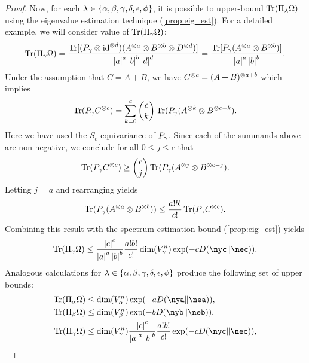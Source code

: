 \documentclass[notitlepage, 10pt]{article}
\begin{document}
\begin{proof}
    Now, for each $\lambda \in \{\alpha, \beta, \gamma, \delta, \epsilon, \phi\}$, it is possible to upper-bound $\operatorname{Tr}(\Pi_{\lambda} \Omega)$ using the eigenvalue estimation technique (\cref{prop:eig_est}).
    For a detailed example, we will consider value of $\operatorname{Tr}(\Pi_{\gamma} \Omega)$:
    \begin{align}
        \operatorname{Tr}(\Pi_{\gamma} \Omega)
        = \frac{\operatorname{Tr}[(P_{\gamma} \otimes \operatorname{id}^{\otimes d})(A^{\otimes a}\otimes B^{\otimes b} \otimes D^{\otimes d})]}{\left|a\right|^{a}\left|b\right|^{b}\left|d\right|^{d}}
        = \frac{\operatorname{Tr}[P_{\gamma}(A^{\otimes a}\otimes B^{\otimes b})]}{\left|a\right|^{a}\left|b\right|^{b}}.
    \end{align}
    Under the assumption that $C = A+B$, we have $C^{\otimes c} = (A+B)^{\otimes a+b}$ which implies
    \begin{equation}
        \operatorname{Tr}(P_{\gamma} C^{\otimes c}) = \sum_{k=0}^{c} \binom{c}{k} \operatorname{Tr}(P_{\gamma} (A^{\otimes k} \otimes B^{\otimes c-k}).
    \end{equation}
    Here we have used the $S_{c}$-equivariance of $P_{\gamma}$.
    Since each of the summands above are non-negative, we conclude for all $0 \leq j \leq c$ that
    \begin{equation}
        \operatorname{Tr}(P_{\gamma} C^{\otimes c}) \geq \binom{c}{j} \operatorname{Tr}(P_{\gamma} (A^{\otimes j} \otimes B^{\otimes c-j}).
    \end{equation}
    Letting $j = a$ and rearranging yields
    \begin{equation}
        \operatorname{Tr}(P_{\gamma} (A^{\otimes a} \otimes B^{\otimes b})) \leq \frac{a!b!}{c!}\operatorname{Tr}(P_{\gamma} C^{\otimes c}).
    \end{equation}
    Combining this result with the spectrum estimation bound (\cref{prop:eig_est}) yields
    \begin{align}
        \Tr(\Pi_{\yc} \Omega)
        \leq \frac{\abs{\ec}^{c}}{\abs{\ea}^{a}\abs{\eb}^{b}}\frac{a!b!}{c!}\dim(V_{\yc}^{n})\exp(-c\kl{\nyc}{\nec}).
    \end{align}
    Analogous calculations for $\lambda \in \{\alpha, \beta, \gamma, \delta, \epsilon, \phi\}$ produce the following set of upper bounds:
    \begin{align}
        \begin{split}
            \Tr(\Pi_{\ya} \Omega)
            &\leq \dim(V_{\ya}^{n}) \exp(- a \kl{\nya}{\nea}), \\
            \Tr(\Pi_{\yb} \Omega)
            &\leq \dim(V_{\yb}^{n}) \exp(- b \kl{\nyb}{\neb}), \\
            \Tr(\Pi_{\yc} \Omega)
            &\leq \dim(V_{\yc}^{n})\frac{\abs{\ec}^{c}}{\abs{\ea}^{a}\abs{\eb}^{b}}\frac{a!b!}{c!} \exp(- c \kl{\nyc}{\nec}), \\

\end{split}
\end{align}
\end{proof}
\end{document}
